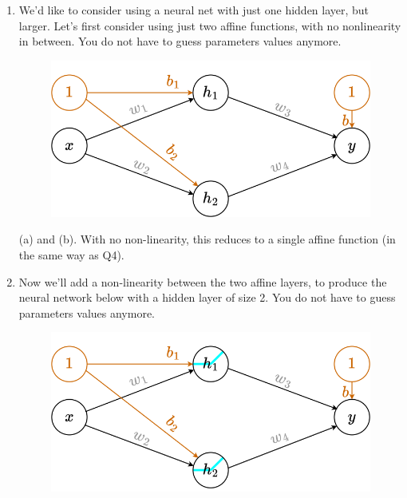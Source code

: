 \documentclass[11pt, a4paper]{article}
\begin{document}
\begin{enumerate}
    \begin{solution}
        (c), (d), (e), and (f). The network can represent all the same functions as Q5 (because note that we could have $w_2 = 1$ and $b_2 = 0$). In addition it can represent (f): the first ReLU can produce the first flat segment, the affine transformation can flip and shift the resulting curve, and then the second ReLU can produce the second flat segment (with the final affine layer not doing anything). Note that (h) cannot be produced since its line has only one flat segment (and the affine layers can only scale, shift, and flip the graph in the vertical dimension; they can’t rotate the graph).
    \end{solution}
    
    \item We’d like to consider using a neural net with just one hidden layer, but larger. Let’s first consider using just two affine functions, with no nonlinearity in between. You do not have to guess parameters values anymore.
    \begin{figure}[h!]
    \centering
    \includegraphics[width=.7\linewidth]{figures/2hiddenlin.png}
\end{figure}

    \begin{solution}
        (a) and (b). With no non-linearity, this reduces to a single affine function (in the same way as Q4).
    \end{solution}
    
    \item Now we’ll add a non-linearity between the two affine layers, to produce the neural network below with a
hidden layer of size 2. You do not have to guess parameters values anymore.
    \begin{figure}[h!]
    \centering
    \includegraphics[width=.7\linewidth]{figures/2hiddennl.png}
\end{figure}


\end{enumerate}
\end{document}
